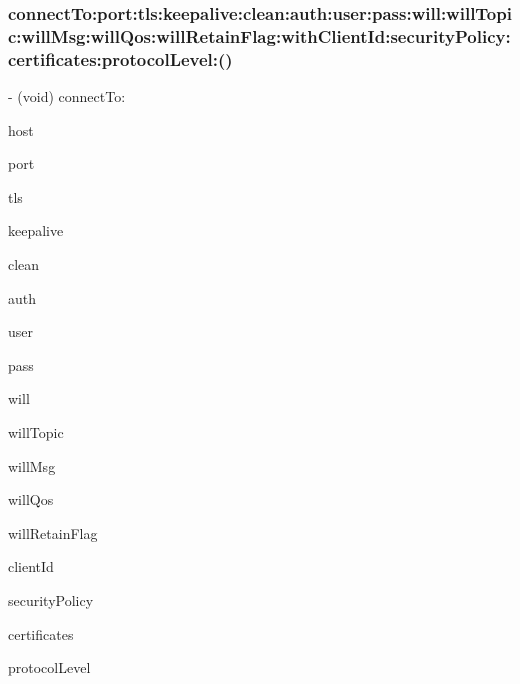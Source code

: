 \subsubsection{\texorpdfstring{connect\+To\+:port\+:tls\+:keepalive\+:clean\+:auth\+:user\+:pass\+:will\+:will\+Topic\+:will\+Msg\+:will\+Qos\+:will\+Retain\+Flag\+:with\+Client\+Id\+:security\+Policy\+:certificates\+:protocol\+Level\+:()}{connectTo:port:tls:keepalive:clean:auth:user:pass:will:willTopic:willMsg:willQos:willRetainFlag:withClientId:securityPolicy:certificates:protocolLevel:()}}
{\footnotesize\ttfamily -\/ (void) connect\+To\+: \begin{DoxyParamCaption}\item[{(N\+S\+String $\ast$)}]{host }\item[{port:(N\+S\+Integer)}]{port }\item[{tls:(B\+O\+OL)}]{tls }\item[{keepalive:(N\+S\+Integer)}]{keepalive }\item[{clean:(B\+O\+OL)}]{clean }\item[{auth:(B\+O\+OL)}]{auth }\item[{user:(N\+S\+String $\ast$)}]{user }\item[{pass:(N\+S\+String $\ast$)}]{pass }\item[{will:(B\+O\+OL)}]{will }\item[{willTopic:(N\+S\+String $\ast$)}]{will\+Topic }\item[{willMsg:(N\+S\+Data $\ast$)}]{will\+Msg }\item[{willQos:(M\+Q\+T\+T\+Qos\+Level)}]{will\+Qos }\item[{willRetainFlag:(B\+O\+OL)}]{will\+Retain\+Flag }\item[{withClientId:(N\+S\+String $\ast$)}]{client\+Id }\item[{securityPolicy:(\hyperlink{interface_m_q_t_t_s_s_l_security_policy}{M\+Q\+T\+T\+S\+S\+L\+Security\+Policy} $\ast$)}]{security\+Policy }\item[{certificates:(N\+S\+Array $\ast$)}]{certificates }\item[{protocolLevel:(M\+Q\+T\+T\+Protocol\+Version)}]{protocol\+Level }\end{DoxyParamCaption}}

